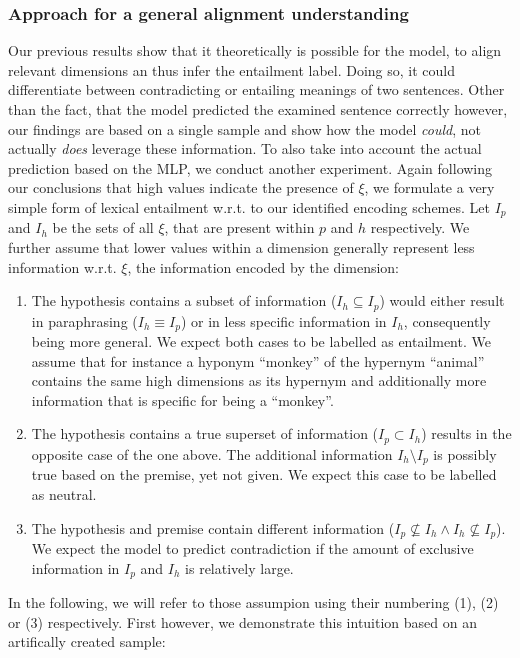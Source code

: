 \subsubsection{Approach for a general alignment understanding}\label{sec:approach_general_alignment_understanding}
Our previous results show that it theoretically is possible for the model, to align relevant dimensions an thus infer the entailment label. Doing so, it could differentiate between contradicting or entailing meanings of two sentences. Other than the fact, that the model predicted the examined sentence correctly however, our findings are based on a single sample and show how the model \textit{could}, not actually \textit{does} leverage these information. To also take into account the actual prediction based on the \ac{MLP}, we conduct another experiment. Again following our conclusions that high values indicate the presence of $\xi$, we formulate a very simple form of lexical entailment w.r.t. to our identified encoding schemes. Let $I_p$ and $I_h$ be the sets of all $\xi$, that are present within $p$ and $h$ respectively. We further assume that lower values within a dimension generally represent less information w.r.t. $\xi$, the information encoded by the dimension:
\begin{enumerate}
\item The hypothesis contains a subset of information ($I_h \subseteq I_p$) would either result in paraphrasing ($I_h \equiv I_p$) or in less specific information in $I_h$, consequently being more general. We expect both cases to be labelled as entailment. We assume that for instance a hyponym ``monkey'' of the hypernym ``animal'' contains the same high dimensions as its hypernym and additionally more information that is specific for being a ``monkey''.
\item The hypothesis contains a true superset of information ($I_p \subset I_h$) results in the opposite case of the one above. The additional information $I_h \setminus I_p$ is possibly true based on the premise, yet not given. We expect this case to be labelled as neutral.
\item The hypothesis and premise contain different information ($I_p \nsubseteq I_h \land I_h \nsubseteq I_p$). We expect the model to predict contradiction if the amount of exclusive information in $I_p$ and $I_h$ is relatively large.
\end{enumerate}
In the following, we will refer to those assumpion using their numbering (1), (2) or (3) respectively. First however, we demonstrate this intuition based on an artifically created sample:
